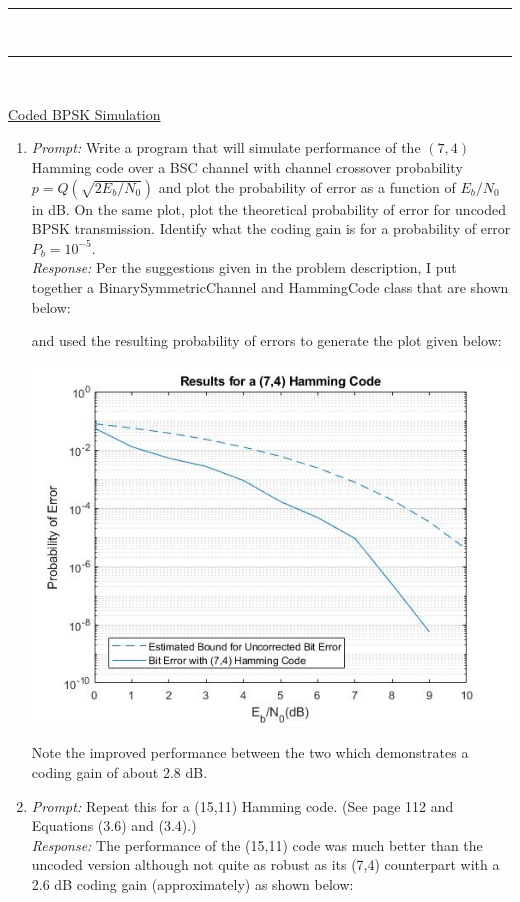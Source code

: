 \documentclass{article}
\newcommand{\problemsep}{\leavevmode\\[0.05in] \rule[\baselineskip/4]{\textwidth}{1pt} \\[0.005in] \rule[\baselineskip]{\textwidth}{1pt}\vspace{-\baselineskip}\leavevmode\\[0.05in]}
\begin{document}
\problemsep
\pagebreak \begin{center} \vspace{-0.2in} \underline{Coded BPSK Simulation} \end{center}
\begin{enumerate}
	\item {\it Prompt: } Write a program that will simulate performance of the $(7,4)$ Hamming code over a BSC channel with channel crossover probability $p=Q(\sqrt{2E_b/N_0})$ and plot the probability of error as a function of $E_b/N_0$ in dB. On the same plot, plot the theoretical probability of error for uncoded BPSK transmission. Identify what the coding gain is for a probability of error $P_b = 10^{-5}$.\\[0.05in]
				{\it Response: } Per the suggestions given in the problem description, I put together a BinarySymmetricChannel and HammingCode class that are shown below:



and used the resulting probability of errors to generate the plot given below:
\begin{center}\includegraphics[width=\textwidth]{BPSKProbabilityError74Hamming.jpg}\end{center}
Note the improved performance between the two which demonstrates a coding gain of about 2.8 dB.
	\item {\it Prompt: } Repeat this for a (15,11) Hamming code. (See page 112 and Equations (3.6) and (3.4).) \\[0.05in]
			  {\it Response: } The performance of the (15,11) code was much better than the uncoded version although not quite as robust as its (7,4) counterpart with a 2.6 dB coding gain (approximately) as shown below:

\end{enumerate}
\end{document}
